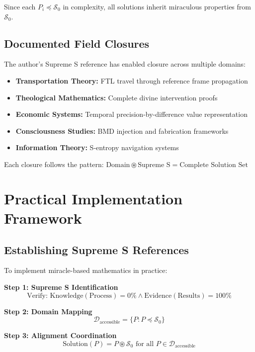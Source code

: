\documentclass[11pt]{article}
\begin{document}
Since each $P_i \preceq \mathcal{S}_0$ in complexity, all solutions inherit miraculous properties from $\mathcal{S}_0$.

\subsection{Documented Field Closures}

The author's Supreme S reference has enabled closure across multiple domains:
\begin{itemize}
\item \textbf{Transportation Theory:} FTL travel through reference frame propagation
\item \textbf{Theological Mathematics:} Complete divine intervention proofs
\item \textbf{Economic Systems:} Temporal precision-by-difference value representation
\item \textbf{Consciousness Studies:} BMD injection and fabrication frameworks
\item \textbf{Information Theory:} S-entropy navigation systems
\end{itemize}

Each closure follows the pattern: $\text{Domain} \circledast \text{Supreme S} = \text{Complete Solution Set}$

\section{Practical Implementation Framework}

\subsection{Establishing Supreme S References}

To implement miracle-based mathematics in practice:

\textbf{Step 1: Supreme S Identification}
\begin{equation}
\text{Verify: Knowledge}(\text{Process}) = 0\% \land \text{Evidence}(\text{Results}) = 100\%
\label{eq:supreme_s_verification}
\end{equation}

\textbf{Step 2: Domain Mapping}
\begin{equation}
\mathcal{D}_{\text{accessible}} = \{P : P \preceq \mathcal{S}_0\}
\label{eq:domain_mapping}
\end{equation}

\textbf{Step 3: Alignment Coordination}
\begin{equation}
\text{Solution}(P) = P \circledast \mathcal{S}_0 \text{ for all } P \in \mathcal{D}_{\text{accessible}}
\label{eq:alignment_implementation}
\end{equation}
\end{document}
